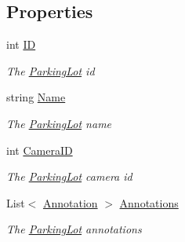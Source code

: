 \subsection*{Properties}
\begin{DoxyCompactItemize}
\item 
int \mbox{\hyperlink{class_eagle_eye_1_1_views_1_1_parking_lot_1_1_parking_lot_a577b278535b3599ca2aeb7ad17232f76}{ID}}
\begin{DoxyCompactList}\small\item\em The \mbox{\hyperlink{class_eagle_eye_1_1_views_1_1_parking_lot_1_1_parking_lot}{Parking\+Lot}} id \end{DoxyCompactList}\item 
string \mbox{\hyperlink{class_eagle_eye_1_1_views_1_1_parking_lot_1_1_parking_lot_afad744515e8684f99befb40034fda405}{Name}}
\begin{DoxyCompactList}\small\item\em The \mbox{\hyperlink{class_eagle_eye_1_1_views_1_1_parking_lot_1_1_parking_lot}{Parking\+Lot}} name \end{DoxyCompactList}\item 
int \mbox{\hyperlink{class_eagle_eye_1_1_views_1_1_parking_lot_1_1_parking_lot_afaaf127e901804b29115875ae66a9e6a}{Camera\+ID}}
\begin{DoxyCompactList}\small\item\em The \mbox{\hyperlink{class_eagle_eye_1_1_views_1_1_parking_lot_1_1_parking_lot}{Parking\+Lot}} camera id \end{DoxyCompactList}\item 
List$<$ \mbox{\hyperlink{class_eagle_eye_1_1_views_1_1_parking_lot_1_1_annotation}{Annotation}} $>$ \mbox{\hyperlink{class_eagle_eye_1_1_views_1_1_parking_lot_1_1_parking_lot_a3ce10bda7806c9dcde5a9d0b3c2f2ad7}{Annotations}}
\begin{DoxyCompactList}\small\item\em The \mbox{\hyperlink{class_eagle_eye_1_1_views_1_1_parking_lot_1_1_parking_lot}{Parking\+Lot}} annotations \end{DoxyCompactList}\end{DoxyCompactItemize}


